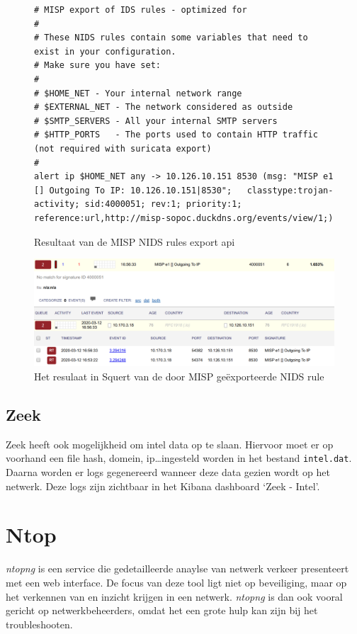 \documentclass[a4paper,12pt]{report}
\begin{document}
\begin{figure}[H]
  \begin{lstlisting}
# MISP export of IDS rules - optimized for 
#
# These NIDS rules contain some variables that need to exist in your configuration.
# Make sure you have set:
#
# $HOME_NET - Your internal network range
# $EXTERNAL_NET - The network considered as outside
# $SMTP_SERVERS - All your internal SMTP servers
# $HTTP_PORTS   - The ports used to contain HTTP traffic (not required with suricata export)
# 
alert ip $HOME_NET any -> 10.126.10.151 8530 (msg: "MISP e1 [] Outgoing To IP: 10.126.10.151|8530";   classtype:trojan-activity; sid:4000051; rev:1; priority:1; reference:url,http://misp-sopoc.duckdns.org/events/view/1;)
  \end{lstlisting}
  \caption{Resultaat van de MISP NIDS rules export api}
  \label{fig:misp-export-txt}
\end{figure}

\begin{figure}[H]
  \centering
  \includegraphics[width=\textwidth]{misp-export-squert}
  \caption{Het resulaat in Squert van de door MISP geëxporteerde NIDS rule}
  \label{fig:misp-export-squert}
\end{figure}

\subsection{Zeek}
Zeek heeft ook mogelijkheid om intel data op te slaan.
Hiervoor moet er op voorhand een file hash, domein, ip\dots ingesteld worden in het bestand \lstinline|intel.dat|.
Daarna worden er logs gegenereerd wanneer deze data gezien wordt op het netwerk.
Deze logs zijn zichtbaar in het Kibana dashboard `Zeek - Intel'.

\section{Ntop}
\emph{ntopng} is een service die gedetailleerde anaylse van netwerk verkeer presenteert met een web interface.
De focus van deze tool ligt niet op beveiliging, maar op het verkennen van en inzicht krijgen in een netwerk.
\emph{ntopng} is dan ook vooral gericht op netwerkbeheerders, omdat het een grote hulp kan zijn bij het troubleshooten.
\autocite{ntop:ntopng}
\end{document}
